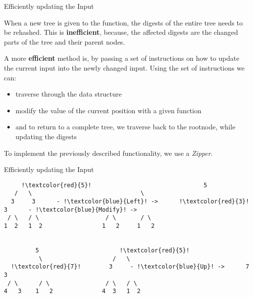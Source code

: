 \begin{slide}{Efficiently updating the Input}

When a new tree is given to the function, the digests of the entire tree needs to be rehashed. This is \textbf{inefficient}, because, the affected digests are the changed parts of the tree and their parent nodes.

A more \textbf{efficient} method is, by passing a set of instructions on how to update the current input into the newly changed input. Using the set of instructions we can: 
\begin{itemize}
  \item traverse through the data structure
  \item modify the value of the current position with a given function
  \item and to return to a complete tree, we traverse back to the rootnode, while updating the digests
\end{itemize}

To implement the previously described functionality, we use a \textit{Zipper}. 
\end{slide}

\begin{slide}{Efficiently updating the Input}
\begin{center}
\begin{verbatim}
     !\textcolor{red}{5}!                                5    
   /   \                               \   
  3     3      - !\textcolor{blue}{Left}! ->      !\textcolor{red}{3}!         3      - !\textcolor{blue}{Modify}! ->
 / \   / \                   / \       / \ 
1  2   1  2                 1   2     1   2
    
    
         5                       !\textcolor{red}{5}!     
          \                    /   \   
  !\textcolor{red}{7}!        3     - !\textcolor{blue}{Up}! ->      7     3   
 / \      / \                / \   / \ 
4   3    1   2              4  3   1  2
\end{verbatim}
\end{center}
\end{slide}




